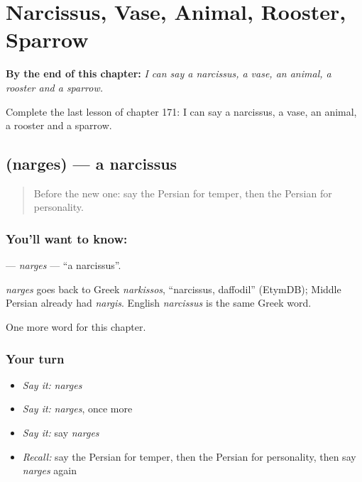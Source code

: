 
\chapter{Narcissus, Vase, Animal, Rooster, Sparrow}
\label{ch:fa-narcissus-vase-animal-rooster-sparrow}

\begin{chapteropening}
\textbf{By the end of this chapter:} \emph{I can say a narcissus, a vase, an animal, a rooster and a sparrow.}

Complete the last lesson of chapter 171: I can say a narcissus, a vase, an animal, a rooster and a sparrow.
\end{chapteropening}

\section[\texorpdfstring{\fa{نرگس} (narges)}{نرگس (narges)}]{ (narges) — a narcissus}

\label{lesson:FA-C171-narges}



\begin{quote}
Before the new one: say the Persian for temper, then the Persian for personality.
\end{quote}

\subsection*{You'll want to know: }
\textbf{} — \emph{narges} — \textquotedblleft{}a narcissus\textquotedblright{}.

\begin{cousinweb}
\emph{narges} goes back to Greek \emph{narkissos}, \textquotedblleft{}narcissus, daffodil\textquotedblright{} (EtymDB); Middle Persian already had \emph{nargis}. English \emph{narcissus} is the same Greek word.
\end{cousinweb}

\begin{grammarlens}[title={What you've built}]
One more word for this chapter.
\end{grammarlens}

\subsection*{Your turn}
\begin{itemize}
\raggedright
  \item \emph{Say it:} \emph{narges}
  \item \emph{Say it:} \emph{narges}, once more
  \item \emph{Say it:} say \emph{narges}
  \item \emph{Recall:} say the Persian for temper, then the Persian for personality, then say \emph{narges} again
\end{itemize}

